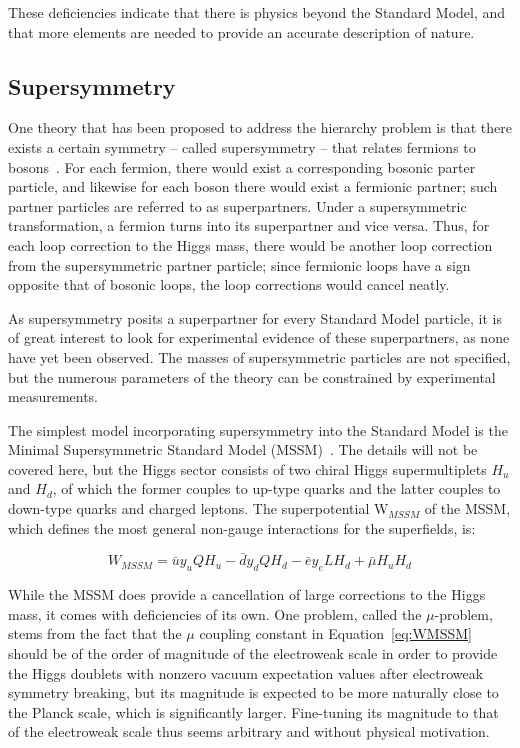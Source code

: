 These deficiencies indicate that there is physics beyond the Standard Model, and that more elements are needed to provide an accurate description of nature.

\subsection{Supersymmetry}

One theory that has been proposed to address the hierarchy problem is that there exists a certain symmetry -- called supersymmetry -- that relates fermions to bosons~\cite{Martin:1997ns}. For each fermion, there would exist a corresponding bosonic parter particle, and likewise for each boson there would exist a fermionic partner; such partner particles are referred to as superpartners. Under a supersymmetric transformation, a fermion turns into its superpartner and vice versa. Thus, for each loop correction to the Higgs mass, there would be another loop correction from the supersymmetric partner particle; since fermionic loops have a sign opposite that of bosonic loops, the loop corrections would cancel neatly.

As supersymmetry posits a superpartner for every Standard Model particle, it is of great interest to look for experimental evidence of these superpartners, as none have yet been observed. The masses of supersymmetric particles are not specified, but the numerous parameters of the theory can be constrained by experimental measurements.

The simplest model incorporating supersymmetry into the Standard Model is the Minimal Supersymmetric Standard Model (MSSM)~\cite{Martin:1997ns}. The details will not be covered here, but the Higgs sector consists of two chiral Higgs supermultiplets $H_u$ and $H_d$, of which the former couples to up-type quarks and the latter couples to down-type quarks and charged leptons. The superpotential W$_{MSSM}$ of the MSSM, which defines the most general non-gauge interactions for the superfields, is:

\begin{equation}
W_{MSSM} = \bar{u}y_{u}QH_{u} - \bar{d}y_{d}QH_{d} - \bar{e}y_{e}LH_{d} + \bar{\mu}H_{u}H_{d}
\label{eq:WMSSM}
\end{equation}

While the MSSM does provide a cancellation of large corrections to the Higgs mass, it comes with deficiencies of its own. One problem, called the $\mu$-problem, stems from the fact that the $\mu$ coupling constant in Equation~\ref{eq:WMSSM} should be of the order of magnitude of the electroweak scale in order to provide the Higgs doublets with nonzero vacuum expectation values after electroweak symmetry breaking, but its magnitude is expected to be more naturally close to the Planck scale, which is significantly larger. Fine-tuning its magnitude to that of the electroweak scale thus seems arbitrary and without physical motivation.

